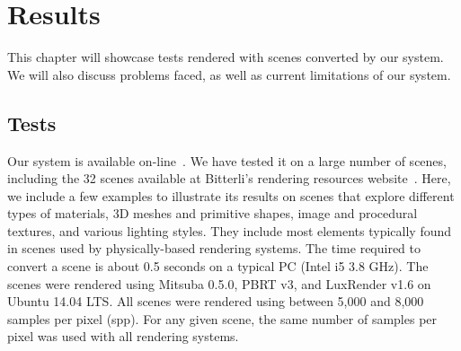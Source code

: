 \chapter{Results}
\label{sec:results}

This chapter will showcase tests rendered with scenes converted by our system. We will also discuss problems faced, as well as current limitations of our system.

\section{Tests}
Our system is available on-line~\cite{sceneConverter}. We have tested it on a large number of scenes, including the 32 scenes available at Bitterli's rendering resources website~\cite{resources16}. Here, we include a few examples to illustrate its results on scenes that explore different types of materials, 3D meshes and primitive shapes, image and procedural textures, and various lighting styles. They include most elements typically found in scenes used by physically-based rendering systems.  The time required to convert a scene is about 0.5 seconds on a typical PC (Intel i5 3.8 GHz). The scenes were rendered using Mitsuba 0.5.0, PBRT v3, and LuxRender v1.6 on Ubuntu 14.04 LTS. All scenes were rendered using between 5,000 and 8,000 samples per pixel (spp). For any given scene, the same number of samples per pixel was used with all rendering systems. 

